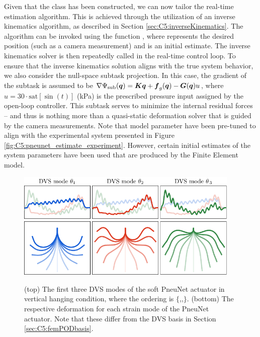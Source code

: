 Given that the  class has been constructed, we can now tailor the real-time estimation algorithm. This is achieved through the utilization of an inverse kinematics algorithm, as described in Section \ref{sec:C5:inverseKinematics}. The algorithm can be invoked using the function , where  represents the desired position (such as a camera measurement) and  is an initial estimate. The inverse kinematics solver is then repeatedly called in the real-time control loop. To ensure that the inverse kinematics solution aligns with the true system behavior, we also consider the null-space subtask projection. In this case, the gradient of the subtask is assumed to be $\nabla \Psi_{\textrm{sub}}({\boldsymbol{q}}) = {\boldsymbol{K}} {\boldsymbol{q}} + {\boldsymbol{f}}_g({\boldsymbol{q}}) - {\boldsymbol{G}}({\boldsymbol{q}}) u$, where $u = 30 \cdot \textrm{sat}\left[ \sin(t) \right]$ (\si{\kilo \pascal}) is the prescribed pressure input assigned by the open-loop controller. This subtask serves to minimize the internal residual forces -- and thus is nothing more than a quasi-static deformation solver that is guided by the camera measurements. Note that model parameter have been pre-tuned to align with the experimental system presented in Figure \ref{fig:C5:pneunet_estimate_experiment}. However, certain initial estimates of the system parameters have been used that are produced by the Finite Element model.

\begin{figure}[!t]
    \centering
    \vspace{5mm}
    \includegraphics*[width=0.95\textwidth]{./pdf/thesis-figure-6-32-1.pdf} \\[0.25em]
    \includegraphics*[width=0.95\textwidth]{./pdf/thesis-figure-6-32-2.pdf}
    \caption{\small (top) The first three DVS modes of the soft PneuNet actuator in vertical hanging condition, where the ordering is $\{$,,$\}$. (bottom) The respective deformation for each strain mode of the PneuNet actuator. Note that these differ from the DVS basis in Section \ref{sec:C5:femPODbasis}.}
    \label{fig:C5:pneunet_modes_fem}
    \vspace{-3mm}
\end{figure}

